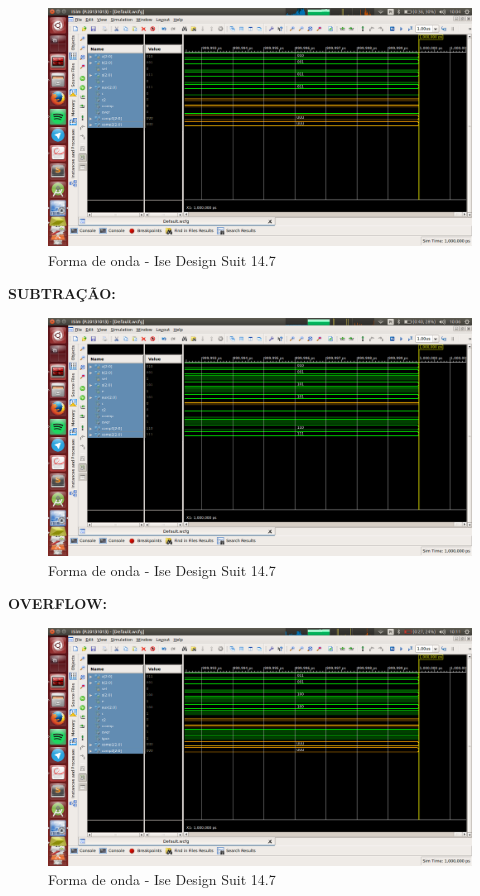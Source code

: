 \documentclass[12pts]{article}
\begin{document}
\begin{figure}[!htb]
  \centering
  \includegraphics[scale=0.3	]{imagens/soma}
  \caption{Forma de onda - Ise Design Suit 14.7}
  \label{figRotulo}
\end{figure}

\newpage
\textbf{SUBTRAÇÃO:}
\begin{figure}[!htb]
  \centering
  \includegraphics[scale=0.3	]{imagens/sub}
  \caption{Forma de onda - Ise Design Suit 14.7}
  \label{figRotulo}
\end{figure}

\newpage
\textbf{OVERFLOW:}
\begin{figure}[!htb]
  \centering
  \includegraphics[scale=0.3	]{imagens/overflow}
  \caption{Forma de onda - Ise Design Suit 14.7}
  \label{figRotulo}
\end{figure}
\end{document}
